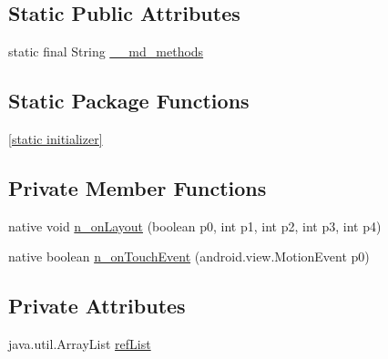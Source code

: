 \subsection*{Static Public Attributes}
\begin{CompactItemize}
\item 
static final String \hyperlink{classmd57018357d52b54713cd814fbd5262dd1f_1_1_frame_renderer_166d3c4d9a96ccf8eb5ff4a0bf70b76f}{\_\-\_\-md\_\-methods}
\end{CompactItemize}
\subsection*{Static Package Functions}
\begin{CompactItemize}
\item 
\hyperlink{classmd57018357d52b54713cd814fbd5262dd1f_1_1_frame_renderer_a810e33e4b7da21f778c64ab4be4d92d}{\mbox{[}static initializer\mbox{]}}
\end{CompactItemize}
\subsection*{Private Member Functions}
\begin{CompactItemize}
\item 
native void \hyperlink{classmd57018357d52b54713cd814fbd5262dd1f_1_1_frame_renderer_87f46153d75eb9e5c7125d71c81795a2}{n\_\-onLayout} (boolean p0, int p1, int p2, int p3, int p4)
\item 
native boolean \hyperlink{classmd57018357d52b54713cd814fbd5262dd1f_1_1_frame_renderer_a8a945d3dcb94555c8ceb309979a5a3d}{n\_\-onTouchEvent} (android.view.MotionEvent p0)
\end{CompactItemize}
\subsection*{Private Attributes}
\begin{CompactItemize}
\item 
java.util.ArrayList \hyperlink{classmd57018357d52b54713cd814fbd5262dd1f_1_1_frame_renderer_f8ecb51614566d34e3a28877de382591}{refList}
\end{CompactItemize}


